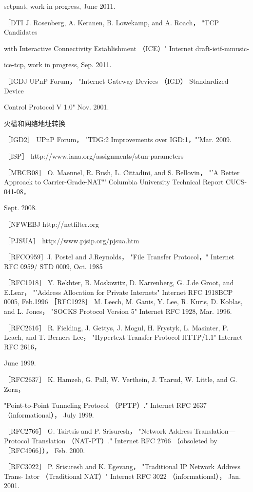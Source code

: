 sctpnat, work in progress, June 2011.

［DTI J. Rosenberg, A. Keranen, B. Lowekamp, and A. Roach， "TCP Candidates

with Interactive Connectivity Establishment （ICE）" Internet draft-ietf-mmusic-

ice-tcp, work in progress, Sep. 2011.

［IGDJ UPnP Forum， "Internet Gateway Devices （IGD） Standardized Device

Control Protocol V 1.0" Nov. 2001.

火樯和网络地址转换

［IGD2］ UPnP Forum， "TDG:2 Improvements over IGD:1，"'Mar. 2009.

［ISP］ http://www.iana.org/assignments/stun-parameters

［MBCB08］ O. Maennel, R. Bush, L. Cittadini, and S. Bellovin， "'A Better Approack
to Carrier-Grade-NAT"' Columbia University Technical Report CUCS-041-08，

Sept. 2008.

［NFWEBJ http://netfilter.org

［PJSUA］ http://www.pjsip.org/pjsua.htm

［RFCO959］J. Postel and J.Reynolds， "File Transfer Protocol，" Internet RFC 0959/
STD 0009, Oct. 1985

［RFC1918］ Y. Rekhter, B. Moskowitz, D. Karrenberg, G. J.de Groot, and E.Lear，
"'Address Allocation for Private Internets" Internet RFC 1918BCP 0005, Feb.1996
［RFC1928］ M. Leech, M. Ganis, Y. Lee, R. Kuris, D. Koblas, and L. Jones， "SOCKS
Protocol Version 5" Internet RFC 1928, Mar. 1996.

［RFC2616］ R. Fielding, J. Gettys, J. Mogul, H. Frystyk, L. Masinter, P. Leach, and
T. Berners-Lee， "Hypertext Transfer Protocol-HTTP/1.1" Internet RFC 2616，

June 1999.

［RFC2637］ K. Hamzeh, G. Pall, W. Verthein, J. Taarud, W. Little, and G. Zorn，

"Point-to-Point Tunneling Protocol （PPTP）." Internet RFC 2637 （informational），
July 1999.

［RFC2766］ G. Tsirtsis and P. Srisuresh， "Network Address Translation—Protocol
Translation （NAT-PT）." Internet RFC 2766 （obsoleted by ［RFC4966］）， Feb. 2000.

［RFC3022］ P. Srisuresh and K. Egevang， "Traditional IP Network Address Trans-
lator （Traditional NAT）" Internet RFC 3022 （informational）， Jan. 2001.

